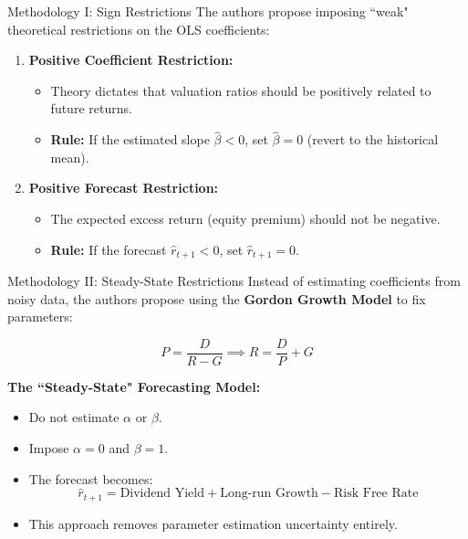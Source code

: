 \documentclass{beamer}
\begin{document}
\begin{frame}{Methodology I: Sign Restrictions}
    The authors propose imposing ``weak" theoretical restrictions on the OLS coefficients:

    \begin{enumerate}
        \item \textbf{Positive Coefficient Restriction:}
            \begin{itemize}
                \item Theory dictates that valuation ratios should be positively related to future returns.
                \item \textbf{Rule:} If the estimated slope $\hat{\beta} < 0$, set $\hat{\beta} = 0$ (revert to the historical mean).
            \end{itemize}
        
        
        \item \textbf{Positive Forecast Restriction:}
            \begin{itemize}
                \item The expected excess return (equity premium) should not be negative.
                \item \textbf{Rule:} If the forecast $\hat{r}_{t+1} < 0$, set $\hat{r}_{t+1} = 0$.
            \end{itemize}
    \end{enumerate}
\end{frame}

\begin{frame}{Methodology II: Steady-State Restrictions}
    Instead of estimating coefficients from noisy data, the authors propose using the \textbf{Gordon Growth Model} to fix parameters:
    
    \begin{equation}
        P = \frac{D}{R - G} \implies R = \frac{D}{P} + G
    \end{equation}

    \textbf{The ``Steady-State" Forecasting Model:}
    \begin{itemize}
        \item Do not estimate $\alpha$ or $\beta$.
        \item Impose \textbf{$\alpha = 0$} and \textbf{$\beta = 1$}.
        \item The forecast becomes:
        \begin{equation}
             \hat{r}_{t+1} = \text{Dividend Yield} + \text{Long-run Growth} - \text{Risk Free Rate}
        \end{equation}
        \item This approach removes parameter estimation uncertainty entirely.
    \end{itemize}
\end{frame}
\end{document}
